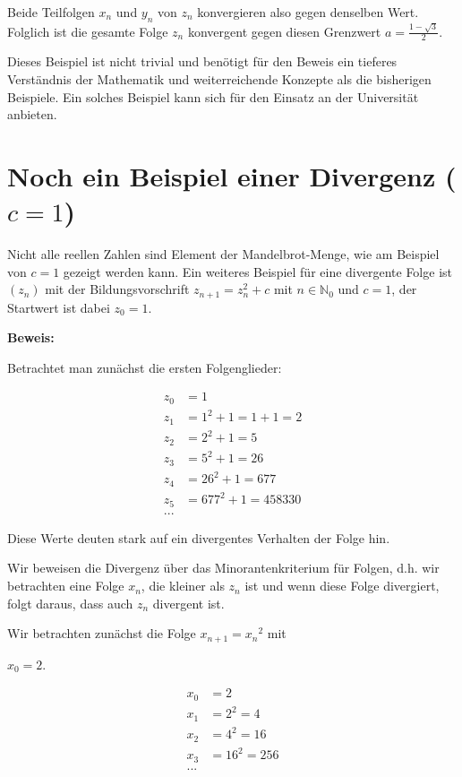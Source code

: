 \documentclass[a4paper, 12pt]{book}
\begin{document}
Beide Teilfolgen \(x_{n}\) und \(y_{n}\) von \(z_{n}\) konvergieren also
gegen denselben Wert. Folglich ist die gesamte Folge \(z_{n}\)
konvergent gegen diesen Grenzwert \(a = \frac{1 - \sqrt{3}}{2}\).
\hfill\blacksquare

Dieses Beispiel ist nicht trivial und benötigt für den Beweis ein
tieferes Verständnis der Mathematik und weiterreichende Konzepte als die
bisherigen Beispiele. Ein solches Beispiel kann sich für den Einsatz an
der Universität anbieten.

\section{Noch ein Beispiel einer Divergenz ($c=1$)}

Nicht alle reellen Zahlen sind Element der Mandelbrot-Menge, wie am
Beispiel von \(c = 1\) gezeigt werden kann. Ein weiteres Beispiel
für eine divergente Folge ist \(\left( z_{n} \right)\) mit der
Bildungsvorschrift \(z_{n + 1} = z_{n}^{2} + c\) mit
\(n \in \mathbb{N}_{0}\) und \(c = 1\), der Startwert ist dabei
\(z_{0} = 1\).

\textbf{Beweis:}

Betrachtet man zunächst die ersten Folgenglieder:

\begin{align*}
z_{0} &= 1\\
z_{1} &= 1^{2} + 1 = 1 + 1 = 2\\
z_{2} &= 2^{2} + 1 = 5\\
z_{3} &= 5^{2} + 1 = 26\\
z_{4} &= 26^{2} + 1 = 677\\
z_{5} &= 677^{2} + 1 = 458330\\
...
\end{align*}

Diese Werte deuten stark auf ein divergentes Verhalten der Folge hin.

Wir beweisen die Divergenz über das Minorantenkriterium für Folgen, d.h.
wir betrachten eine Folge \(x_{n}\), die kleiner als \(z_{n}\) ist und
wenn diese Folge divergiert, folgt daraus, dass auch \(z_{n}\) divergent
ist.

Wir betrachten zunächst die Folge \(x_{n + 1} = {x_{n}}^{2}\) mit

\(x_{0} = 2\).

\begin{align*}
x_{0} &= 2\\
x_{1} &= 2^{2} = 4\\
x_{2} &= 4^{2} = 16\\
x_{3} &= 16^{2} = 256\\
...
\end{align*}
\end{document}
